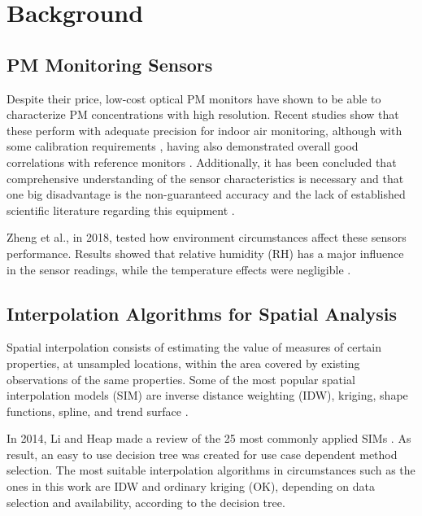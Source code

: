 
\section{Background}
\label{sec: backg}
\subsection{PM Monitoring Sensors}

Despite their price, low-cost optical PM monitors have shown to be able to characterize PM concentrations with high resolution. Recent studies show that these perform with adequate precision for indoor air monitoring, although with some calibration requirements \cite{Manikonda2016}, having also demonstrated overall good correlations with reference monitors \cite{Sayahi2018}. Additionally, it has been concluded that comprehensive understanding of the sensor characteristics is necessary and that one big disadvantage is the non-guaranteed accuracy and the lack of established scientific literature regarding this equipment \cite{Kuula2019}.

Zheng et al., in 2018, tested how environment circumstances affect these sensors performance. Results showed that relative humidity (RH) has a major influence in the sensor readings, while the temperature effects were negligible \cite{Zheng2018}.

\subsection{Interpolation Algorithms for Spatial Analysis}

Spatial interpolation consists of estimating the value of measures of certain properties, at unsampled locations, within the area covered by existing observations of the same properties. Some of the most popular spatial interpolation models (SIM) are inverse distance weighting (IDW), kriging, shape functions, spline, and trend surface \cite{Li2008}.

In 2014, Li and Heap made a review of the 25 most commonly applied SIMs \cite{Li2014}. As result, an easy to use decision tree was created for use case dependent method selection. The most suitable interpolation algorithms in circumstances such as the ones in this work are IDW and ordinary kriging (OK), depending on data selection and availability, according to the decision tree.

